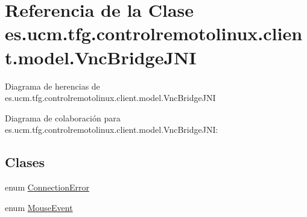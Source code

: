 \hypertarget{classes_1_1ucm_1_1tfg_1_1controlremotolinux_1_1client_1_1model_1_1VncBridgeJNI}{\section{Referencia de la Clase es.\-ucm.\-tfg.\-controlremotolinux.\-client.\-model.\-Vnc\-Bridge\-J\-N\-I}
\label{classes_1_1ucm_1_1tfg_1_1controlremotolinux_1_1client_1_1model_1_1VncBridgeJNI}
}


Diagrama de herencias de es.\-ucm.\-tfg.\-controlremotolinux.\-client.\-model.\-Vnc\-Bridge\-J\-N\-I


Diagrama de colaboración para es.\-ucm.\-tfg.\-controlremotolinux.\-client.\-model.\-Vnc\-Bridge\-J\-N\-I\-:
\subsection*{Clases}
\begin{DoxyCompactItemize}
\item 
enum \hyperlink{enumes_1_1ucm_1_1tfg_1_1controlremotolinux_1_1client_1_1model_1_1VncBridgeJNI_1_1ConnectionError}{Connection\-Error}
\item 
enum \hyperlink{enumes_1_1ucm_1_1tfg_1_1controlremotolinux_1_1client_1_1model_1_1VncBridgeJNI_1_1MouseEvent}{Mouse\-Event}
\end{DoxyCompactItemize}
